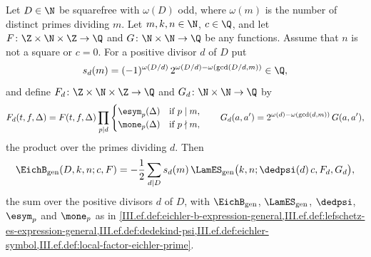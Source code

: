Let $D\in\N$ be squarefree with $\omega(D)$ odd, where $\omega(m)$ is the number of distinct primes dividing $m$. Let $m,k,n\in\N$, $c\in\Q$,
and let $F\colon\Z\times\N\times\Z\to\Q$ and $G\colon\N\times\N\to\Q$ be any functions. Assume that $n$ is not a square or $c=0$. For a
positive divisor $d$ of $D$ put
\[
  s_d(m)=(-1)^{\omega(D/d)}\,2^{\omega(D/d)-\omega(\gcd(D/d,m))}\in\Q,
\]
and define $F_d\colon\Z\times\N\times\Z\to\Q$ and $G_d\colon\N\times\N\to\Q$ by
\[
  F_d(t,f,\Delta)=F(t,f,\Delta)\prod_{p\mid d}\begin{cases}\esym_p(\Delta)&\text{if }p\mid m,\\ \mone_p(\Delta)&\text{if }p\nmid m,\end{cases}
  \qquad G_d(a,a')=2^{\omega(d)-\omega(\gcd(d,m))}\,G(a,a'),
\]
the product over the primes dividing $d$. Then
\[
  \EichB_{\mathrm{gen}}(D,k,n;c,F)=-\frac12\sum_{d\mid D}s_d(m)\,\LamES_{\mathrm{gen}}\bigl(k,n;\dedpsi(d)\,c,F_d,G_d\bigr),
\]
the sum over the positive divisors $d$ of $D$, with $\EichB_{\mathrm{gen}}$, $\LamES_{\mathrm{gen}}$, $\dedpsi$, $\esym_p$ and $\mone_p$ as in
\cref{III.ef.def:eichler-b-expression-general,III.ef.def:lefschetz-es-expression-general,III.ef.def:dedekind-psi,III.ef.def:eichler-symbol,III.ef.def:local-factor-eichler-prime}.
